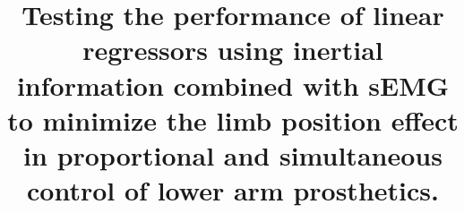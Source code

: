 



\pagebreak             %




\setlength\cftaftertoctitleskip{2pt}
\setlength\cftafterloftitleskip{6pt}
\setlength\cftafterlottitleskip{6pt}
\title{Testing the performance of linear regressors using inertial information combined with sEMG to minimize the limb position effect in proportional and simultaneous control of lower arm prosthetics.}

\pagestyle{empty} %
\fancyfoot[LE,RO]{\thepage}
\fancyhead[LE,LO,RE,RO]{}

%

\pagestyle{fancy}
%
\clearpage


\tableofcontents
\cleardoublepage


\fancyhead[RE,LO]{}
\fancyhead[RE,LO]{\color{aaublue}\small\nouppercase\leftmark} %
\pagestyle{fancy}


